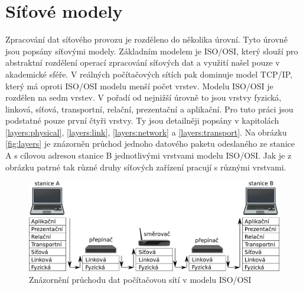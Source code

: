 \section{Síťové modely}\label{section:models} %
Zpracování dat síťového provozu je rozděleno do několika úrovní. Tyto úrovně jsou popsány síťovými modely.
Základním modelem je ISO/OSI, který slouží pro abstraktní rozdělení operací zpracování síťových dat a využití
našel pouze v akademické sféře. V reálných počítačových sítích pak dominuje model TCP/IP, který má oproti
ISO/OSI modelu menší počet vrstev. Modelu ISO/OSI je rozdělen na sedm vrstev. V pořadí od nejnižší úrovně to
jsou vrstvy fyzická, linková, síťová, transportní, relační, prezentační a aplikační. Pro tuto práci jsou
podstatné pouze první čtyři vrstvy. Ty jsou detailněji popsány v kapitolách \ref{layers:physical},
\ref{layers:link}, \ref{layers:network} a \ref{layers:transport}. Na obrázku \ref{fig:layers} je
znázorněn průchod jednoho datového paketu odeslaného ze stanice A s cílovou adresou stanice B jednotlivými vrstvami modelu ISO/OSI. Jak je z obrázku patrné tak různé druhy síťových zařízení pracují s různými vrstvami.

\begin{figure}[!htbp]
	\centering
	\includegraphics[scale=.25]{fig/layers.pdf}
	\caption{Znázornění průchodu dat počítačovou sítí v modelu ISO/OSI}
\end{figure}\label{fig:layers}

